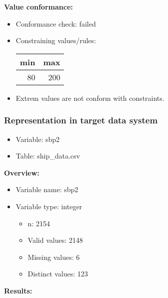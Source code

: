 \documentclass[
]{article}
\providecommand{\tightlist}{%
  \setlength{\itemsep}{0pt}\setlength{\parskip}{0pt}}
\begin{document}
\textbf{Value conformance:}

\begin{itemize}
\tightlist
\item
  Conformance check: failed
\item
  Constraining values/rules:

  \begin{table}[H]
  \centering
  \begin{tabular}{r|r}
  \hline
  \textbf{min} & \textbf{max}\\
  \hline
  80 & 200\\
  \hline
  \end{tabular}
  \end{table}
\item
  Extrem values are not conform with constraints.
\end{itemize}

\newpage

\hypertarget{representation-in-target-data-system-22}{%
\subsubsection{\texorpdfstring{Representation in \textbf{target} data
system}{Representation in target data system}}\label{representation-in-target-data-system-22}}

\begin{itemize}
\tightlist
\item
  Variable: sbp2
\item
  Table: ship\_data.csv
\end{itemize}

\textbf{Overview:}

\begin{itemize}
\tightlist
\item
  Variable name: sbp2
\item
  Variable type: integer

  \begin{itemize}
  \tightlist
  \item
    n: 2154
  \item
    Valid values: 2148
  \item
    Missing values: 6
  \item
    Distinct values: 123
  \end{itemize}
\end{itemize}

\textbf{Results:}\\
\end{document}
